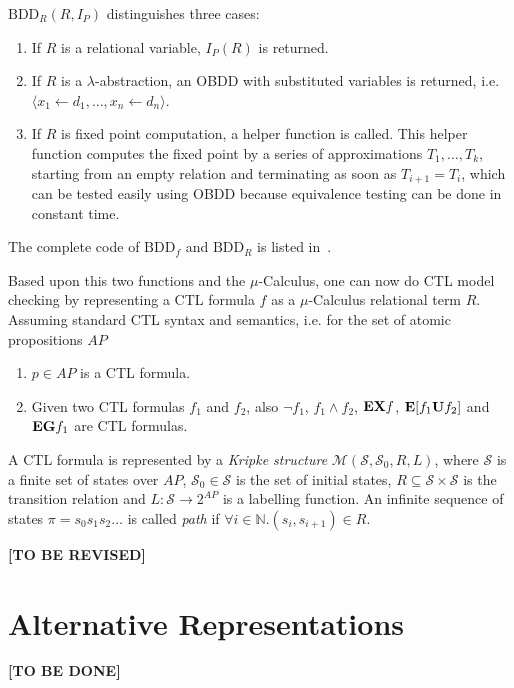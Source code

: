 \documentclass{vldb}
\newcommand{\tbr}{\textbf{[TO BE REVISED]}}
\newcommand{\tbd}{\textbf{[TO BE DONE]}}
\begin{document}
$\text{BDD}_R \left( R, I_P \right)$ distinguishes three cases:
\begin{enumerate}
    \item{If $R$ is a relational variable, $I_P \left( R \right)$ is returned.}
    \item{
        If $R$ is a $\lambda$-abstraction, an OBDD with substituted variables is
        returned, i.e. $\langle x_1 \leftarrow d_1, \ldots, x_n \leftarrow d_n \rangle$.
    }
    \item{
        If $R$ is fixed point computation, a helper function is called. This
        helper function computes the fixed point by a series of approximations
        $T_1, \ldots, T_k$, starting from an empty relation and terminating as
        soon as $T_{i+1} = T_i$, which can be tested easily using OBDD because
        equivalence testing can be done in constant time.
    }
\end{enumerate}

The complete code of $\text{BDD}_f$ and $\text{BDD}_R$ is listed
in~\cite[p. 432]{BURCH90}.

Based upon this two functions and the $\mu$-Calculus, one can now do CTL model
checking by representing a CTL formula $f$ as a $\mu$-Calculus relational term
$R$. Assuming standard CTL syntax and semantics, i.e. for the set of atomic
propositions $AP$
\begin{enumerate}
    \item{$p \in AP$ is a CTL formula.}
    \item{
        Given two CTL formulas $f_1$ and $f_2$, also $\neg f_1$, $f_1 \land f_2$,
        $\text{\textbf{EX}} f$,
        $\text{\textbf{E}} \lbrack f_1 \text{\textbf{U}} f_2 \rbrack$ and
        $\text{\textbf{EG}} f_1$ are CTL formulas.
    }
\end{enumerate}

A CTL formula is represented by a \textit{Kripke structure} \newline
$\mathcal{M} \left( \mathcal{S}, \mathcal{S}_0, R, L \right)$, where $\mathcal{S}$
is a finite set of states over $AP$, $\mathcal{S}_0 \in \mathcal{S}$ is the set
of initial states, $R \subseteq \mathcal{S} \times \mathcal{S}$ is the transition
relation and $L: \mathcal{S} \rightarrow 2^{AP}$ is a labelling function. An
infinite sequence of states $\pi = s_0s_1s_2\ldots$ is called \textit{path} if
$\forall i \in \mathbb{N}.\left( s_i, s_{i+1} \right) \in R$.

\tbr

\section{Alternative Representations}
\label{sec:alternative-representations}

\tbd

\balance



\end{document}
